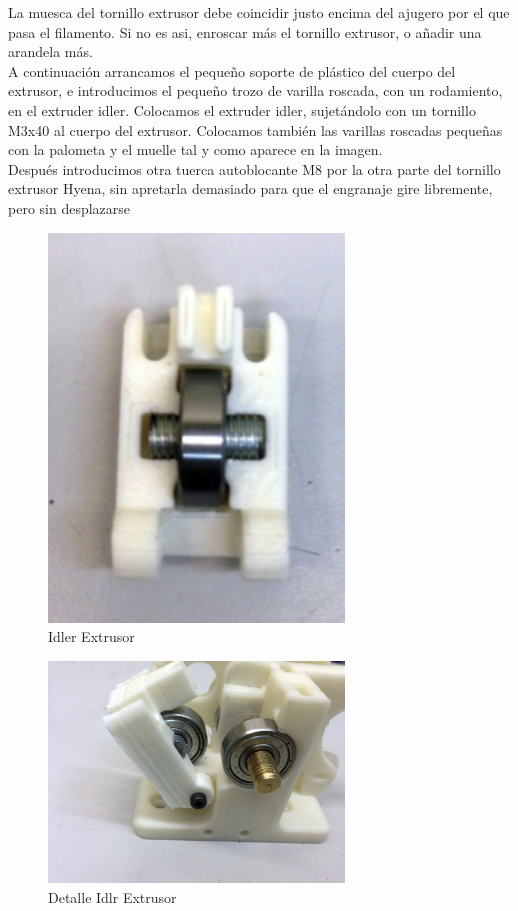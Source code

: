 		La muesca del tornillo extrusor debe coincidir justo encima del ajugero por el que pasa el filamento. Si no es asi, enroscar más el tornillo extrusor, o añadir una arandela más.\\
		A continuación arrancamos el pequeño soporte de plástico del cuerpo del extrusor, e introducimos el pequeño trozo de varilla roscada, con un rodamiento, en el extruder idler. Colocamos el extruder idler, sujetándolo con un tornillo M3x40 al cuerpo del extrusor. Colocamos también las varillas roscadas pequeñas con la palometa y el muelle tal y como aparece en la imagen.\\
		Después introducimos otra tuerca autoblocante M8 por la otra parte del tornillo extrusor Hyena, sin apretarla demasiado para que el engranaje gire libremente, pero sin desplazarse\\
		\begin{figure}[!htp]
			\centering
		\includegraphics[width=0.7\textwidth]{../../Fotos/100.jpg}
		\caption{ Idler Extrusor}
		\label{fig:3.ext}
	\end{figure}
	\begin{figure}[!htp]
		\centering
	\includegraphics[width=0.7\textwidth]{../../Fotos/101.jpg}
	\caption{Detalle Idlr Extrusor }
	\label{fig:4.ext}
\end{figure}
